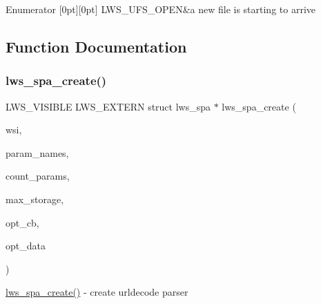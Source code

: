 \begin{DoxyEnumFields}{Enumerator}
[0pt][0pt]{}\mbox{\label{group__form-parsing_gga41a74a822771d3dce89751aa3bce28aea2d25de44865bd44e5a3903a2bab9ca83}} 
L\+W\+S\+\_\+\+U\+F\+S\+\_\+\+O\+P\+EN&a new file is starting to arrive \\
\hline

\end{DoxyEnumFields}


\subsection{Function Documentation}
\mbox{\label{group__form-parsing_gaacb1217231c8615cf65f36e70dff90ed}} 
\subsubsection{\texorpdfstring{lws\+\_\+spa\+\_\+create()}{lws\_spa\_create()}}
{\footnotesize\ttfamily L\+W\+S\+\_\+\+V\+I\+S\+I\+B\+LE L\+W\+S\+\_\+\+E\+X\+T\+E\+RN struct lws\+\_\+spa $\ast$ lws\+\_\+spa\+\_\+create (\begin{DoxyParamCaption}\item[{struct \hyperlink{structlws}{lws} $\ast$}]{wsi,  }\item[{const char $\ast$const $\ast$}]{param\+\_\+names,  }\item[{int}]{count\+\_\+params,  }\item[{int}]{max\+\_\+storage,  }\item[{\hyperlink{group__form-parsing_ga5a70527c0861c2ffa3d29333a6aa7f8e}{lws\+\_\+spa\+\_\+fileupload\+\_\+cb}}]{opt\+\_\+cb,  }\item[{void $\ast$}]{opt\+\_\+data }\end{DoxyParamCaption})}

\hyperlink{group__form-parsing_gaacb1217231c8615cf65f36e70dff90ed}{lws\+\_\+spa\+\_\+create()} -\/ create urldecode parser


